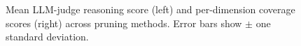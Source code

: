 \begin{figure}[h]
  \centering
  \caption{Mean LLM-judge reasoning score (left) and per-dimension
  coverage scores (right) across pruning methods.
  Error bars show $\pm$ one standard deviation.}
  \label{fig:reasoning}
\end{figure}
